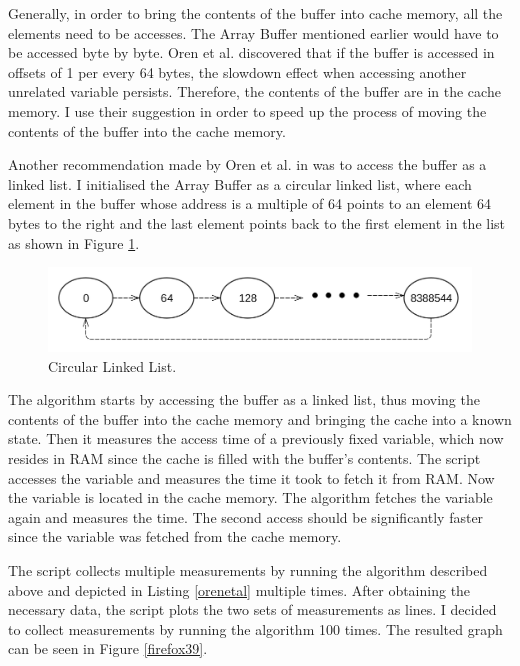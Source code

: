 \documentclass[10pt,a4paper,twoside]{book}
\begin{document}
Generally, in order to bring the contents of the buffer into cache memory, all the elements need to be accesses. The Array Buffer mentioned earlier would have to be accessed byte by byte. Oren et al. \cite{oren2015spy} discovered that if the buffer is accessed in offsets of 1 per every 64 bytes, the slowdown effect when accessing another unrelated variable persists. Therefore, the contents of the buffer are in the cache memory. I use their suggestion in order to speed up the process of moving the contents of the buffer into the cache memory.

Another recommendation made by Oren et al. in \cite{oren2015spy} was to access the buffer as a linked list. I initialised the Array Buffer as a circular linked list, where each element in the buffer whose address is a multiple of 64 points to an element 64 bytes to the right and the last element points back to the first element in the list as shown in Figure \ref{circularlinkedlist}.

\begin{figure}[h]
\centering
\includegraphics[width=\textwidth]{figures/circularlinkedlist.png}
\caption{Circular Linked List.}
\label{circularlinkedlist}
\end{figure}

The algorithm starts by accessing the buffer as a linked list, thus moving the contents of the buffer into the cache memory and bringing the cache into a known state. Then it measures the access time of a previously fixed variable, which now resides in RAM since the cache is filled with the buffer's contents. The script accesses the variable and measures the time it took to fetch it from RAM. Now the variable is located in the cache memory. The algorithm fetches the variable again and measures the time. The second access should be significantly faster since the variable was fetched from the cache memory.

The script collects multiple measurements by running the algorithm described above and depicted in Listing \ref{orenetal} multiple times. After obtaining the necessary data, the script plots the two sets of measurements as lines. I decided to collect measurements by running the algorithm 100 times. The resulted graph can be seen in Figure \ref{firefox39}.
\end{document}
